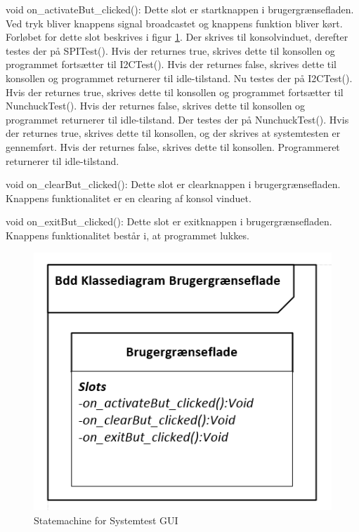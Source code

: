 \noindent void on\_activateBut\_clicked(): \newline
Dette slot er startknappen i brugergrænsefladen. Ved tryk bliver knappens signal broadcastet og knappens funktion bliver kørt. Forløbet for dette slot beskrives i figur \ref{fig:stmGUI}. Der skrives til konsolvinduet, derefter testes der på SPITest(). Hvis der returnes true, skrives dette til konsollen og programmet fortsætter til I2CTest(). Hvis der returnes false, skrives dette til konsollen og programmet returnerer til idle-tilstand. Nu testes der på I2CTest(). Hvis der returnes true, skrives dette til konsollen og programmet fortsætter til NunchuckTest(). Hvis der returnes false, skrives dette til konsollen og programmet returnerer til idle-tilstand.
Der testes der på NunchuckTest(). Hvis der returnes true, skrives dette til konsollen, og der skrives at systemtesten er gennemført. Hvis der returnes false, skrives dette til konsollen. Programmeret returnerer til idle-tilstand. \newline

\noindent void on\_clearBut\_clicked(): \newline
Dette slot er clearknappen i brugergrænsefladen. Knappens funktionalitet er en clearing af konsol vinduet. \newline

\noindent void on\_exitBut\_clicked(): \newline
Dette slot er exitknappen i brugergrænsefladen. Knappens funktionalitet består i, at programmet lukkes.


\begin{figure}[H]
	\centering
	\includegraphics[width=\textwidth]{DesignOgImplementering/images/KlassediagramGUI}
	\caption{Statemachine for Systemtest GUI}
	\label{fig:stmGUI}
\end{figure}

